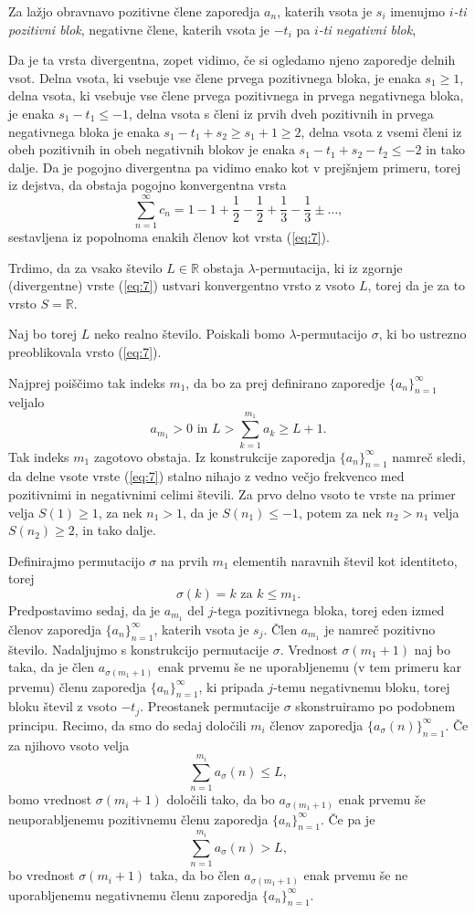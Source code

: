 \documentclass[12pt,a4paper,reqno]{amsart}
\theoremstyle{definition} %
\theoremstyle{plain} %
\newcommand{\R}{\mathbb R}
\begin{document}
Za lažjo obravnavo pozitivne člene zaporedja $a_n$, katerih vsota je $s_i$ imenujmo \emph{$i$-ti pozitivni blok}, negativne člene, katerih vsota je $-t_i$ pa \emph{$i$-ti negativni blok},

Da je ta vrsta divergentna, zopet vidimo, če si ogledamo njeno zaporedje delnih vsot. Delna vsota, ki vsebuje vse člene prvega pozitivnega bloka, je enaka $s_1 \geq 1$, delna vsota, ki vsebuje vse člene prvega pozitivnega in prvega negativnega bloka, je enaka $s_1-t_1 \leq -1$, delna vsota s členi iz prvih dveh pozitivnih in prvega negativnega bloka je enaka $s_1-t_1+s_2 \geq s_1+1 \geq 2$, delna vsota z vsemi členi iz obeh pozitivnih in obeh negativnih blokov je enaka $s_1-t_1+s_2-t_2 \leq -2$ in tako dalje. Da je pogojno divergentna pa vidimo enako kot v prejšnjem primeru, torej iz dejstva, da obstaja pogojno konvergentna vrsta $$\sum_{n=1}^{\infty}c_n=1-1+\frac{1}{2}-\frac{1}{2}+\frac{1}{3}-\frac{1}{3}\pm \ldots,$$ 
sestavljena iz popolnoma enakih členov kot vrsta (\ref{eq:7}).

Trdimo, da za vsako število $L\in \R$ obstaja $\lambda$-permutacija, ki iz zgornje (divergentne) vrste (\ref{eq:7}) ustvari konvergentno vrsto z vsoto $L$, torej da je za to vrsto $S=\R$. %

Naj bo torej $L$ neko realno število. Poiskali bomo $\lambda$-permutacijo $\sigma$, ki bo ustrezno preoblikovala vrsto (\ref{eq:7}). 

Najprej poiščimo tak indeks $m_1$, da bo za prej definirano zaporedje $\{a_n\}_{n=1}^{\infty}$ veljalo $$a_{m_1}>0\textrm{ in }L>\sum_{k=1}^{m_1}a_k \geq L+1.$$ Tak indeks $m_1$ zagotovo obstaja. Iz konstrukcije zaporedja $\{a_n\}_{n=1}^{\infty}$ namreč sledi, da delne vsote vrste (\ref{eq:7}) stalno nihajo z vedno večjo frekvenco med pozitivnimi in negativnimi celimi števili. Za prvo delno vsoto te vrste na primer velja $S(1)\geq 1$, za nek $n_1>1$, da je $S(n_1)\leq -1$, potem za nek $n_2>n_1$ velja $S(n_2) \geq 2$, in tako dalje.

Definirajmo permutacijo $\sigma$ na prvih $m_1$ elementih naravnih števil kot identiteto, torej $$\sigma(k)=k\textrm{ za }k\leq m_1.$$ Predpostavimo sedaj, da je $a_{m_1}$ del $j$-tega pozitivnega bloka, torej eden izmed členov zaporedja $\{a_n\}_{n=1}^{\infty}$, katerih vsota je $s_j$. Člen $a_{m_1}$ je namreč pozitivno število. Nadaljujmo s konstrukcijo permutacije $\sigma$. Vrednost $\sigma(m_1+1)$ naj bo taka, da je člen $a_{\sigma(m_1+1)}$ enak prvemu še ne uporabljenemu (v tem primeru kar prvemu) členu zaporedja $\{a_n\}_{n=1}^{\infty}$, ki pripada $j$-temu negativnemu bloku, torej bloku števil z vsoto $-t_j$. 
Preostanek permutacije $\sigma$ skonstruiramo po podobnem principu. Recimo, da smo do sedaj določili $m_i$ členov zaporedja $\{a_\sigma(n)\}_{n=1}^{\infty}$. Če za njihovo vsoto velja $$\sum^{m_i}_{n=1}a_\sigma(n) \leq L,$$ bomo vrednost $\sigma(m_i+1)$ določili tako, da bo $a_{\sigma(m_1+1)}$ enak prvemu še neuporabljenemu pozitivnemu členu zaporedja $\{a_n\}_{n=1}^{\infty}$. Če pa je $$\sum^{m_i}_{n=1}a_\sigma(n) > L,$$ bo vrednost $\sigma(m_i+1)$ taka, da bo člen $a_{\sigma(m_1+1)}$ enak prvemu še ne uporabljenemu negativnemu členu zaporedja $\{a_n\}_{n=1}^{\infty}$.%
\end{document}
